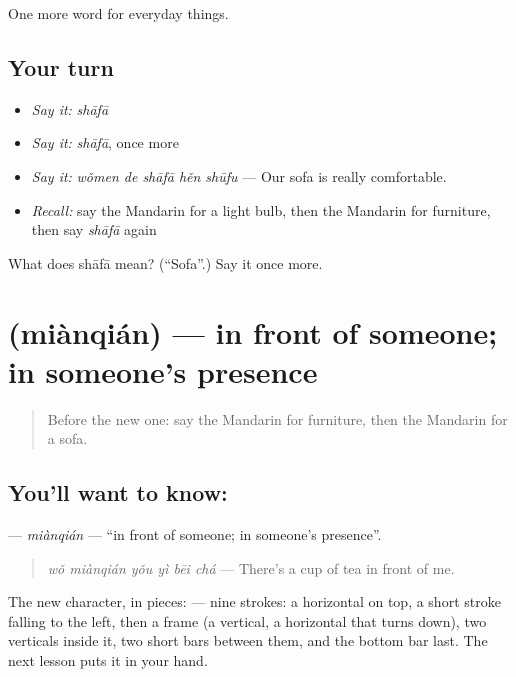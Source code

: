 \begin{grammarlens}[title={What you've built}]
One more word for everyday things.
\end{grammarlens}

\subsection*{Your turn}
\begin{itemize}
\raggedright
  \item \emph{Say it:} \emph{shāfā}
  \item \emph{Say it:} \emph{shāfā}, once more
  \item \emph{Say it:} \emph{wǒmen de shāfā hěn shūfu} — Our sofa is really comfortable.
  \item \emph{Recall:} say the Mandarin for a light bulb, then the Mandarin for furniture, then say \emph{shāfā} again
\end{itemize}

\begin{tcolorbox}[breakable,colback=teal!4,colframe=teal!35!black,title={Before you move on}]
What does shāfā mean? (\textquotedblleft{}Sofa\textquotedblright{}.) Say it once more.
\end{tcolorbox}
\section[\texorpdfstring{\zh{面前} (miànqián)}{面前 (miànqián)}]{ (miànqián) — in front of someone; in someone's presence}

\label{lesson:ZH-C175-mianqian}



\begin{quote}
Before the new one: say the Mandarin for furniture, then the Mandarin for a sofa.
\end{quote}

\subsection*{You'll want to know: }
\textbf{} — \emph{miànqián} — \textquotedblleft{}in front of someone; in someone's presence\textquotedblright{}.

\begin{quote}
\textbf{} \emph{wǒ miànqián yǒu yì bēi chá} — There's a cup of tea in front of me.
\end{quote}

The new character, in pieces:  — nine strokes: a horizontal on top, a short stroke falling to the left, then a frame (a vertical, a horizontal that turns down), two verticals inside it, two short bars between them, and the bottom bar last. The next lesson puts it in your hand.

